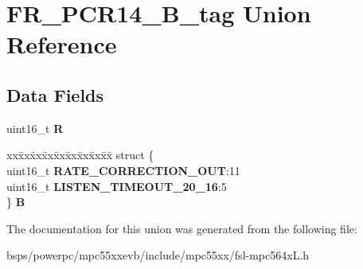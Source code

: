 \hypertarget{unionFR__PCR14__16B__tag}{}\section{F\+R\+\_\+\+P\+C\+R14\+\_\+B\+\_\+tag Union Reference}
\label{unionFR__PCR14__16B__tag}
\subsection*{Data Fields}
\begin{DoxyCompactItemize}
\item 
\mbox{\label{unionFR__PCR14__16B__tag_a312f54fee9a13e557eb00df1bd094c23}} 
uint16\+\_\+t {\bfseries R}
\item 
\mbox{\label{unionFR__PCR14__16B__tag_a7c85753c52632592463f9f8924651f4d}} 
\begin{tabbing}
xx\=xx\=xx\=xx\=xx\=xx\=xx\=xx\=xx\=\kill
struct \{\\
\>uint16\_t {\bfseries RATE\_CORRECTION\_OUT}:11\\
\>uint16\_t {\bfseries LISTEN\_TIMEOUT\_20\_16}:5\\
\} {\bfseries B}\\

\end{tabbing}\end{DoxyCompactItemize}


The documentation for this union was generated from the following file\+:\begin{DoxyCompactItemize}
\item 
bsps/powerpc/mpc55xxevb/include/mpc55xx/fsl-\/mpc564x\+L.\+h\end{DoxyCompactItemize}
